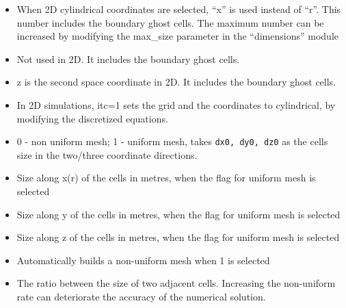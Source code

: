 \begin{itemize}
\item
{}
{When 2D cylindrical coordinates are selected, ``x'' is used instead 
 of ``r''. This number includes the boundary ghost cells. The maximum number can be 
 increased by modifying the max\_size parameter in the ``dimensions'' module}

\item
{}
{Not used in 2D. It includes the boundary ghost cells.}

\item
{}
{z is the second space coordinate in 2D. It includes the boundary ghost cells.}

\item
{}
{In 2D simulations, itc=1 sets the grid and the coordinates to cylindrical,
by modifying the discretized equations.}

\item
{}
{0 - non uniform mesh; 1 - uniform mesh, takes {\tt dx0, dy0, dz0} as the
cells size in the two/three coordinate directions.}

\item
{}
{Size along x(r) of the cells in metres, when the flag for uniform mesh is selected}

\item
{}
{Size along y of the cells in metres, when the flag for uniform mesh is selected}

\item
{}
{Size along z of the cells in metres, when the flag for uniform mesh is selected}

\item
{}
{Automatically builds a non-uniform mesh when 1 is selected}

\item
{}
{The ratio between the size of two adjacent cells. Increasing the non-uniform rate can deteriorate the accuracy of the numerical solution.}


\end{itemize}
